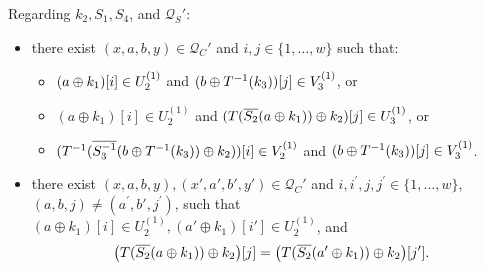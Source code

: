 \begin{definition}
\begin{itemize}[leftmargin=10mm]
\begin{itemize}
	\end{itemize}
%
\end{itemize}
%
%
Regarding $k_2,S_1,S_4$, and $\mathcal{Q}_S'$:
%
%
\begin{itemize}[leftmargin=10mm]
	\item[\bfour] there exist $(x,a,b,y) \in \mathcal{Q}_{C}'$ and $i, j\in\{1, \ldots, w\}$ such that:
	\begin{itemize}
		\item $(a\oplus k_1)[i]\in U_2^{(1)}$ and $(b\oplus T^{-1}(k_3))[j]\in V_3^{(1)}$, or
		\item $(a \oplus k_1)[i]\in U_{2}^{(1)}$ and $(T(\overline{S_2}(a \oplus k_1))\oplus k_2)[j]\in U_{3}^{(1)}$, or
		\item $(T^{-1}(\overline{S_3^{-1}}(b\oplus T^{-1}(k_3))\oplus k_2))[i]\in V_2^{(1)}$ and $(b\oplus T^{-1}(k_3))[j]\in V_{3}^{(1)}$.
	\end{itemize}
	\item[\bfive] there exist $(x,a,b,y),(x',a',b',y') \in \mathcal{Q}_{C}'$ and $i, i^{\prime},j, j^{\prime} \in\{1, \ldots, w\}$, $(a,b, j) \neq \left(a^{\prime}, b',j^{\prime}\right)$, such that $(a \oplus k_1)[i]\in U_{2}^{(1)}, (a' \oplus k_1)[i']\in U_{2}^{(1)}$, and
	$$\big(T(\overline{S_2}(a\oplus k_1))\oplus k_2\big)[j]=\big(T(\overline{S_2}(a'\oplus k_1))\oplus k_2\big)[j'].
$$
\end{itemize}
\end{definition}

